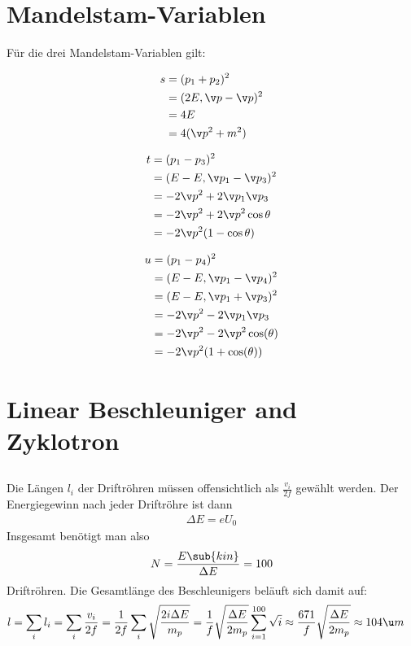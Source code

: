 \documentclass[exb]{exercise_5.0}
\begin{document}
\section{Mandelstam-Variablen}
Für die drei Mandelstam-Variablen gilt:\\[-4ex]
\begin{minipage}[t]{0.33\textwidth}
    \begin{align*}
    s &= (p_1+p_2)^2\\
    &= (2E, \v p - \v p)^2\\
    &= 4E\\
    &= 4(\v p^2 + m^2)
    \end{align*}
\end{minipage}\begin{minipage}[t]{0.33\textwidth}
    \begin{align*}
        t &= (p_1 - p_3)^2\\
    &= (E-E, \v p_1 - \v p_3)^2\\
    &= -2\v p^2 + 2 \v p_1 \v p_3\\
    &= -2\v p^2 + 2 \v p^2 \cos\theta\\
    &= -2\v p^2 (1-  \cos\theta)
    \end{align*}
\end{minipage}\begin{minipage}[t]{0.33\textwidth}
    \begin{align*}
    u
    &= (p_1 - p_4)^2\\
    &= (E-E,\v p_1-\v p_4)^2\\
    &= (E-E,\v p_1+\v p_3)^2\\
    &= -2\v p^2 - 2\v p_1 \v p_3\\
    &= -2\v p^2 - 2\v p^2 \cos (\theta)\\
    &= -2\v p^2 (1+ \cos (\theta))
    \end{align*}
\end{minipage}


\section{Linear Beschleuniger and Zyklotron}
\subsection{}
Die Längen $l_i$ der Driftröhren müssen offensichtlich als $\frac{v_i}{2f}$ gewählt werden. Der Energiegewinn nach jeder Driftröhre ist dann 
\begin{align*}
    \Delta E = e U_0
\end{align*}
Insgesamt benötigt man also 
\begin{align*}
    N = \frac{E\sub{kin}}{\Delta E} = 100
\end{align*}
Driftröhren. Die Gesamtlänge des Beschleunigers beläuft sich damit auf:
\begin{align*}
    l &= \sum_i l_i = \sum_i \frac{v_i}{2f} = \frac1 {2f}\sum_i \sqrt{\frac{2 i \Delta E}{m_p}} = \frac1f\sqrt{\frac{\Delta E }{2 m_p}}\sum_{i=1}^{100}  \sqrt{i}\approx \frac{671}f\sqrt{\frac{\Delta E }{2 m_p}}
    \approx 104 \u m 
\end{align*}
\end{document}
